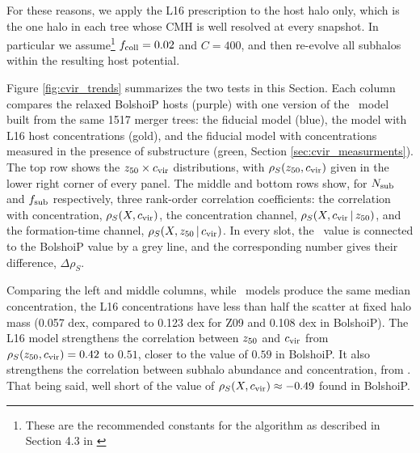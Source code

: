 \documentclass[twocolumn,apj,numberedappendix,twocolappendix,iop]{openjournal}
\begin{document}
For these reasons, we apply the L16 prescription to the host halo only, which is the one halo in each tree whose CMH is well resolved at every snapshot. In particular we assume\footnote{These are the recommended constants for the \cite{Parkinson.etal.08} algorithm as described in Section 4.3 in \citealt{Ludlow.etal.16}} $f_{\rm coll}=0.02$ and $C=400$, and then re-evolve all subhalos within the resulting host potential. 

Figure \ref{fig:cvir_trends} summarizes the two tests in this Section. Each column compares the relaxed BolshoiP hosts (purple) with one version of the \SatGen\ model built from the same 1517 merger trees: the fiducial model (blue), the model with L16 host concentrations (gold), and the fiducial model with concentrations measured in the presence of substructure (green, Section \ref{sec:cvir_measurments}). The top row shows the $z_{50} \times c_{\rm vir}$ distributions, with $\rho_S(z_{50}, c_{\rm vir})$ given in the lower right corner of every panel. The middle and bottom rows show, for $N_{\rm sub}$ and $f_{\rm sub}$ respectively, three rank-order correlation coefficients: the correlation with concentration, $\rho_S(X, c_{\rm vir})$, the concentration channel, $\rho_S(X, c_{\rm vir} \,|\, z_{50})$, and the formation-time channel, $\rho_S(X, z_{50} \,|\, c_{\rm vir})$. In every slot, the \SatGen\ value is connected to the BolshoiP value by a grey line, and the corresponding number gives their difference, $\Delta \rho_S$.

Comparing the left and middle columns, while \SatGen\ models produce the same median concentration, the L16 concentrations have less than half the scatter at fixed halo mass (0.057 dex, compared to 0.123 dex for Z09 and 0.108 dex in BolshoiP). The L16 model strengthens the correlation between $z_{50}$ and $c_{\rm vir}$ from $\rho_S(z_{50}, c_{\rm vir}) = 0.42$ to $0.51$, closer to the value of $0.59$ in BolshoiP. It also strengthens the correlation between subhalo abundance and concentration, from  . That being said,   well short of the value of $\rho_S(X, c_{\rm vir}) \approx -0.49$ found in BolshoiP.
\end{document}
